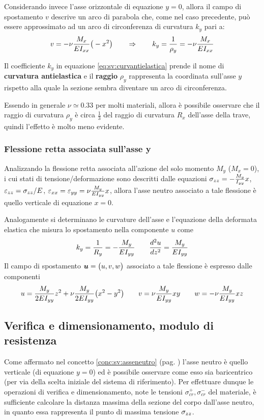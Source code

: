 		Considerando invece l'asse orizzontale di equazione $y=0$, allora il campo di spostamento $v$ descrive un arco di parabola che, come nel caso precedente, può essere approssimato ad un arco di circonferenza di curvatura $k_y$ pari a:
		\begin{equation} \label{eq:sv:curvantielastica}
			v = -\nu \frac{M_x}{EI_{xx}} \big(-x^2\big) \qquad \Rightarrow \qquad k_y = \frac 1 {\rho_y} = - \nu \frac{M_x}{EI_{xx}}
		\end{equation}
		\begin{concetto}
			Il coefficiente $k_y$ in equazione \ref{eq:sv:curvantielastica} prende il nome di \textbf{curvatura antielastica} e il \textbf{raggio} $\rho_y$ rappresenta la coordinata sull'asse $y$ rispetto alla quale la sezione sembra diventare un arco di circonferenza.
		\end{concetto}
		\begin{nota}
			Essendo in generale $\nu \simeq 0.33$ per molti materiali, allora è possibile osservare che il raggio di curvatura $\rho_y$ è circa $\frac 1 3$ del raggio di curvatura $R_x$ dell'asse della trave, quindi l'effetto è molto meno evidente.
		\end{nota}
	
		\subsubsection{Flessione retta associata sull'asse y}
			Analizzando la flessione retta associata all'azione del solo momento $M_y$ ($M_x=0$), i cui stati di tensione/deformazione sono descritti dalle equazioni $\sigma_{zz} = - \frac {M_y} {I_{yy}} x$, $\varepsilon_{zz} = \sigma_{zz}/E$, $\varepsilon_{xx}=\varepsilon_{yy} = \nu \frac{M_y}{EI_{yy}}x$, allora l'asse neutro associato a tale flessione è quello verticale di equazione $x = 0$.
			
			Analogamente si determinano le curvature dell'asse e l'equazione della deformata elastica che misura lo spostamento nella componente $u$ come
			\[ k_y = \frac 1 {R_y}  = - \frac{M_y}{EI_{yy}} \qquad \frac{d^2u}{dz^2} = \frac{M_y}{EI_{yy}}  \]
			Il campo di spostamento $\boldsymbol{u} = \big(u,v,w\big)$ associato a tale flessione è espresso dalle componenti
			\[ u = \frac{M_y}{2EI_{yy}} z^2 + \nu \frac{M_y}{2EI_{yy}} \big(x^2-y^2\big) \qquad v = \nu \frac{M_y}{EI_{yy}}xy \qquad w = - \nu \frac {M_y}{EI_{yy}} xz \]
			
			
			
	\subsection{Verifica e dimensionamento, modulo di resistenza}
		Come affermato nel concetto \ref{conc:sv:asseneutro} (pag. \pageref{conc:sv:asseneutro}) l'asse neutro è quello verticale (di equazione $y=0$) ed è possibile osservare come esso sia baricentrico (per via della scelta iniziale del sistema di riferimento). Per effettuare dunque le operazioni di verifica e dimensionamento, note le tensioni $\sigma_{cr}^+,\sigma_{cr}^-$ del materiale, è sufficiente calcolare la distanza massima della sezione del corpo dall'asse neutro, in quanto essa rappresenta il punto di massima tensione $\sigma_{zz}$.
		
